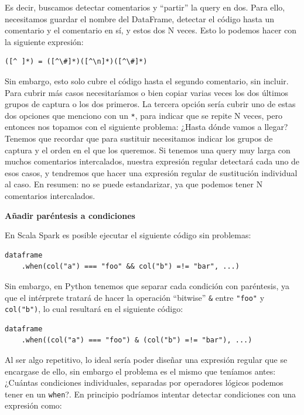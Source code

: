 \documentclass[12pt,twoside,titlepage]{report}
\newcommand{\quotes}[1]{``#1''}
\begin{document}
Es decir, buscamos detectar comentarios y \quotes{partir} la query en dos. Para ello, necesitamos guardar el nombre del DataFrame, detectar el código hasta un comentario y el comentario en sí, y estos dos N veces. Esto lo podemos hacer con la siguiente expresión:

\begin{lstlisting}
([^ ]*) = ([^\#]*)([^\n]*)([^\#]*)
\end{lstlisting}

Sin embargo, esto solo cubre el código hasta el segundo comentario, sin incluir. Para cubrir más casos necesitaríamos o bien copiar varias veces los dos últimos grupos de captura o los dos primeros. La tercera opción sería cubrir uno de estas dos opciones que menciono con un \texttt{*}, para indicar que se repite N veces, pero entonces nos topamos con el siguiente problema: ¿Hasta dónde vamos a llegar? Tenemos que recordar que para sustituir necesitamos indicar los grupos de captura y el orden en el que los queremos. Si tenemos una query muy larga con muchos comentarios intercalados, nuestra expresión regular detectará cada uno de esos casos, y tendremos que hacer una expresión regular de sustitución individual al caso. En resumen: no se puede estandarizar, ya que podemos tener N comentarios intercalados.

\textbf{Añadir paréntesis a condiciones}

En Scala Spark es posible ejecutar el siguiente código sin problemas:

\begin{lstlisting}
dataframe
	.when(col("a") === "foo" && col("b") =!= "bar", ...)
\end{lstlisting}

Sin embargo, en Python tenemos que separar cada condición con paréntesis, ya que el intérprete tratará de hacer la operación \quotes{bitwise} \texttt{\&} entre \texttt{"foo"} y \texttt{col("b")}, lo cual resultará en el siguiente código:

\begin{lstlisting}
dataframe
	.when((col("a") === "foo") & (col("b") =!= "bar"), ...)
\end{lstlisting}

Al ser algo repetitivo, lo ideal sería poder diseñar una expresión regular que se encargase de ello, sin embargo el problema es el mismo que teníamos antes: ¿Cuántas condiciones individuales, separadas por operadores lógicos podemos tener en un \texttt{when}?. En principio podríamos intentar detectar condiciones con una expresión como:
\end{document}
